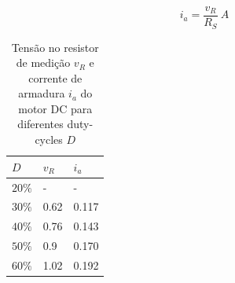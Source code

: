 \documentclass{article}
\begin{document}
\begin{equation}
i_a=\frac{v_R}{R_S}\ A
\end{equation}

\begin{table}[H]
	\centering
	\caption{Tensão no resistor de medição $v_R$ e corrente de armadura $i_a$ do motor DC para diferentes duty-cycles $D$}
	\label{tab:iabuck}
	\begin{tabular}{|l|l|l|}
		\hline
		$D$    & $v_R$ & $i_a$ \\ \hline
		$20\%$ & -     & -     \\ \hline
		$30\%$ & 0.62  & 0.117 \\ \hline
		$40\%$ & 0.76  & 0.143 \\ \hline
		$50\%$ & 0.9   & 0.170 \\ \hline
		$60\%$ & 1.02  & 0.192 \\ \hline
	\end{tabular}
\end{table}
\end{document}
